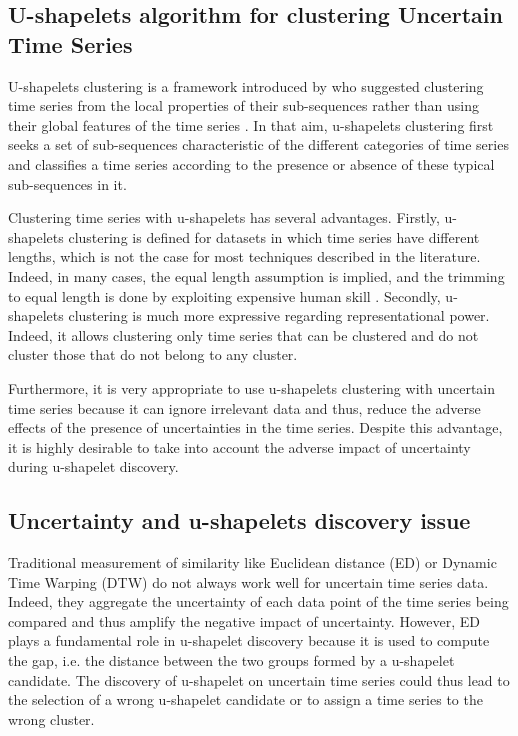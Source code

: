 \subsection{U-shapelets algorithm for clustering Uncertain Time Series }

U-shapelets clustering is a framework introduced by\cite{zakaria2012clustering} who suggested clustering time series from the local properties of their sub-sequences rather than
using their global features of the time series \cite{zhang2016unsupervised}. In that aim, u-shapelets clustering first seeks a set of sub-sequences characteristic of the different categories of time series and classifies a time series according to the presence or absence of these typical sub-sequences in it. 

Clustering time series with u-shapelets has several advantages. Firstly, u-shapelets clustering is defined for datasets in which  time series have different lengths, which is not the case for most techniques described in the literature. Indeed, in many cases, the equal length assumption is implied,
and the trimming to equal length is done by exploiting expensive human skill \cite{ulanova2015scalable}.  Secondly, u-shapelets clustering is much more expressive regarding representational power. Indeed, it allows clustering only time series that can be
clustered and do not cluster those that do not belong to any cluster.

Furthermore, it is very appropriate to use u-shapelets clustering with uncertain time series because it can ignore irrelevant data and thus, reduce the adverse effects of the presence of uncertainties in the time series. Despite this advantage, it is highly desirable to take into account the adverse impact of uncertainty during u-shapelet discovery.

\subsection{Uncertainty and u-shapelets discovery issue}
Traditional measurement of similarity like Euclidean distance (ED) or Dynamic Time  Warping (DTW) do not always work well for uncertain time series data. Indeed,   they aggregate the uncertainty of each data point of the time series being compared and thus amplify the negative impact of uncertainty. However, ED plays a   fundamental role in u-shapelet discovery because it is used to compute the gap, i.e. the distance between the two groups formed by a u-shapelet candidate. The discovery of u-shapelet on uncertain time series could thus lead to the selection of a wrong u-shapelet candidate or to assign a time series to the wrong cluster.
 
